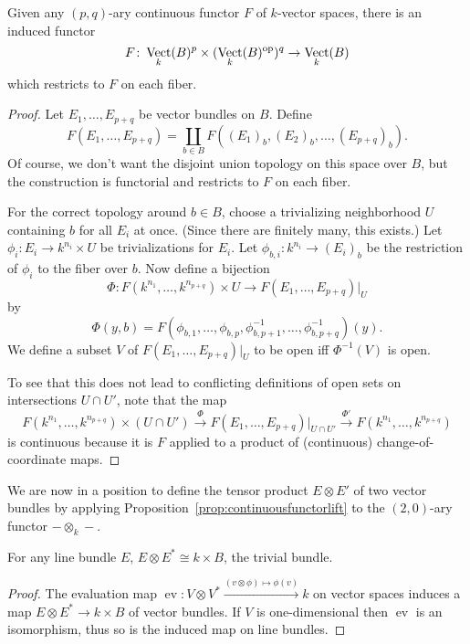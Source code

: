 \documentclass[a4paper,openany]{scrbook}
\DeclareMathOperator{\Vect}{Vect}
\begin{document}
\begin{prop}\label{prop:continuousfunctorlift}
Given any $(p,q)$-ary continuous functor $F$ of $k$-vector spaces, there is an induced functor
\[
F\colon \Vect_k(B)^p \times (\Vect_k(B)^\op)^q \to \Vect_k(B)
\]
which restricts to $F$ on each fiber.
\end{prop}
\begin{proof}
Let $E_1,\dots,E_{p+q}$ be vector bundles on $B$. Define
\[
F(E_1,\dots,E_{p+q}) = \coprod_{b \in B} F((E_1)_b,(E_2)_b,\dots,(E_{p+q})_b).
\]
Of course, we don't want the disjoint union topology on this space over $B$, but the construction is functorial and restricts to $F$ on each fiber.

For the correct topology around $b \in B$, choose a trivializing neighborhood $U$ containing $b$ for all $E_i$ at once. (Since there are finitely many, this exists.) Let $\phi_i\colon E_i \to k^{n_i} \times U$ be trivializations for $E_i$. Let $\phi_{b,i}\colon k^{n_i} \to (E_i)_b$ be the restriction of $\phi_i$ to the fiber over $b$. Now define a bijection
\[
\Phi\colon F(k^{n_1},\dots,k^{n_{p+q}}) \times U \to F(E_1,\dots,E_{p+q})|_U
\]
by
\[
\Phi(y,b) = F(\phi_{b,1},\dots,\phi_{b,p},\phi_{b,p+1}^{-1},\dots,\phi_{b,p+q}^{-1})(y).
\]
We define a subset $V$ of $F(E_1,\dots,E_{p+q})|_U$ to be open iff $\Phi^{-1}(V)$ is open.

To see that this does not lead to conflicting definitions of open sets on intersections $U \cap U'$, note that the map
\[
F(k^{n_1},\dots,k^{n_{p+q}}) \times (U \cap U') \xrightarrow{\Phi} F(E_1,\dots,E_{p+q})|_{U\cap U'} \xrightarrow{\Phi'} F(k^{n_1},\dots,k^{n_{p+q}})
\]
is continuous because it is $F$ applied to a product of (continuous) change-of-coordinate maps.
\end{proof}

We are now in a position to define the tensor product $E \otimes E'$ of two vector bundles by applying Proposition~\ref{prop:continuousfunctorlift} to the $(2,0)$-ary functor $- \otimes_k -$.

\begin{lemma}
For any line bundle $E$, $E \otimes E^* \cong k \times B$, the trivial bundle.
\end{lemma}
\begin{proof}
The evaluation map $\operatorname{ev}\colon V \otimes V^* \xrightarrow{(v \otimes \phi) \mapsto \phi(v)} k$ on vector spaces induces a map $E \otimes E^* \to k \times B$ of vector bundles. If $V$ is one-dimensional then $\operatorname{ev}$ is an isomorphism, thus so is the induced map on line bundles.
\end{proof}
\end{document}
